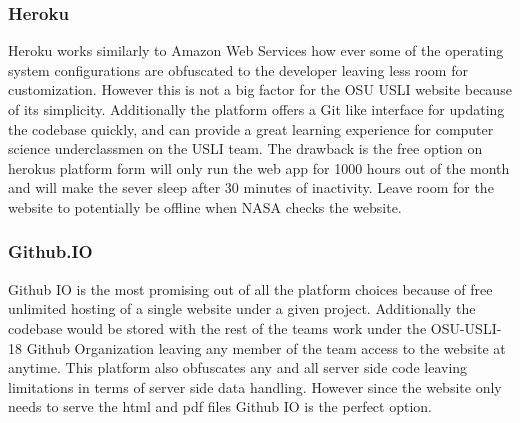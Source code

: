\documentclass[onecolumn, draftclsnofoot,10pt, compsoc]{IEEEtran}
\begin{document}
\subsubsection{Heroku}
Heroku works similarly to Amazon Web Services how ever some of the operating system configurations are obfuscated to the developer leaving less room for customization. However this is not a big factor for the OSU USLI website because of its simplicity. Additionally the platform offers a Git like interface for updating the codebase quickly, and can provide a great learning experience for computer science underclassmen on the USLI team. The drawback is the free option on herokus platform form will only run the web app for 1000 hours out of the month and will make the sever sleep after 30 minutes of inactivity. Leave room for the website to potentially be offline when NASA checks the website.
\subsubsection{Github.IO}
Github IO is the most promising out of all the platform choices because of free unlimited hosting of a single website under a given project. Additionally the codebase would be stored with the rest of the teams work under the OSU-USLI-18 Github Organization leaving any member of the team access to the website at anytime. This platform also obfuscates any and all server side code leaving limitations in terms of server side data handling. However since the website only needs to serve the html and pdf files Github IO is the perfect option. 

\nocite{*}%

%
\end{document}
